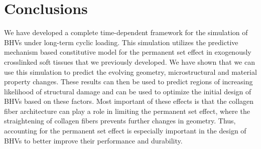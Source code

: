 \section{Conclusions}
    We have developed a complete time-dependent framework for the simulation of BHVs under long-term cyclic loading. This simulation utilizes the predictive mechanism based constitutive model for the permanent set effect in exogenously crosslinked soft tissues that we previously developed. We have shown that we can use this simulation to predict the evolving geometry, microstructural and material property changes. These results can then be used to predict regions of increasing likelihood of structural damage and can be used to optimize the initial design of BHVs based on these factors. Most important of these effects is that the collagen fiber architecture can play a role in limiting the permanent set effect, where the straightening of collagen fibers prevents further changes in geometry. Thus, accounting for the permanent set effect is especially important in the design of BHVs to better improve their performance and durability. 
	

